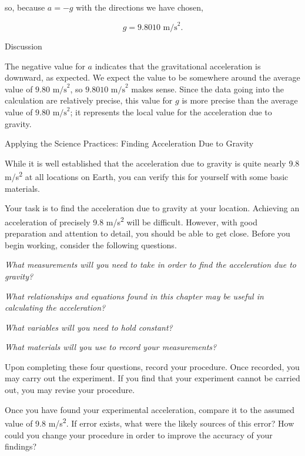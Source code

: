 \documentclass[
]{book}
\newenvironment{tinysection}{}{}
\newenvironment{note}{}{}
\begin{document}
so, because \({a = {- g}}{}\) with the directions we have chosen,

\leavevmode\hypertarget{import-auto-id1706716}{}%
\[{{{g = 9}\text{.}\text{8010\ m/s}^{2}}.}{}\]

\begin{tinysection}

{Discussion}

\end{tinysection}

The negative value for \(a{}\) indicates that the gravitational
acceleration is downward, as expected. We expect the value to be
somewhere around the average value of \({9\text{.}\text{80\ m/s}^{2}}{}\),
so \({9\text{.}\text{8010\ m/s}^{2}}{}\) makes sense. Since the data going
into the calculation are relatively precise, this value for \(g{}\) is
more precise than the average value of
\({9\text{.}\text{80\ m/s}^{2}}{}\); it represents the local value for the
acceleration due to gravity.

\hypertarget{fs-id2149869}{}
\begin{note}

Applying the Science Practices: Finding Acceleration Due to Gravity

While it is well established that the acceleration due to gravity is
quite nearly 9.8 m/s\textsuperscript{2} at all locations on Earth, you can verify this
for yourself with some basic materials.

Your task is to find the acceleration due to gravity at your location.
Achieving an acceleration of precisely 9.8 m/s\textsuperscript{2} will be difficult.
However, with good preparation and attention to detail, you should be
able to get close. Before you begin working, consider the following
questions.

\emph{What measurements will you need to take in order to find the
acceleration due to gravity?}

\emph{What relationships and equations found in this chapter may be useful in
calculating the acceleration?}

\emph{What variables will you need to hold constant?}

\emph{What materials will you use to record your measurements?}

Upon completing these four questions, record your procedure. Once
recorded, you may carry out the experiment. If you find that your
experiment cannot be carried out, you may revise your procedure.

Once you have found your experimental acceleration, compare it to the
assumed value of 9.8 m/s\textsuperscript{2}. If error exists, what were the likely
sources of this error? How could you change your procedure in order to
improve the accuracy of your findings?

\end{note}
\end{document}
